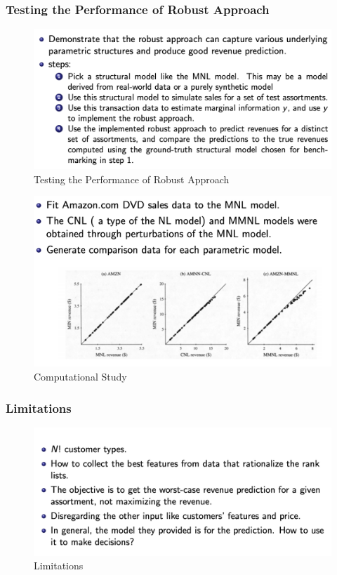 \documentclass[11pt,a4paper]{article}
\begin{document}
\subsubsection{ Testing the Performance of Robust Approach}
\begin{center}\begin{figure}[htbp]
    \centering
    \includegraphics[scale=0.5]{RLCM5.png}
    \caption{Testing the Performance of Robust Approach}
    \label{}
\end{figure}\end{center}
\begin{center}\begin{figure}[htbp]
    \centering
    \includegraphics[scale=0.5]{RLCM6.png}
    \caption{Computational Study}
    \label{}
\end{figure}\end{center}

\subsubsection{ Limitations}
\begin{center}\begin{figure}[htbp]
    \centering
    \includegraphics[scale=0.5]{RLCM7.png}
    \caption{Limitations}
    \label{}
\end{figure}\end{center}
\end{document}
